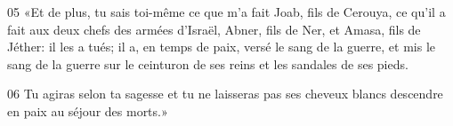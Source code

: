 
05 «Et de plus, tu sais toi-même ce que m’a fait Joab, fils de Cerouya, ce qu’il a fait aux deux chefs des armées d’Israël, Abner, fils de Ner, et Amasa, fils de Jéther: il les a tués; il a, en temps de paix, versé le sang de la guerre, et mis le sang de la guerre sur le ceinturon de ses reins et les sandales de ses pieds.

06 Tu agiras selon ta sagesse et tu ne laisseras pas ses cheveux blancs descendre en paix au séjour des morts.»
